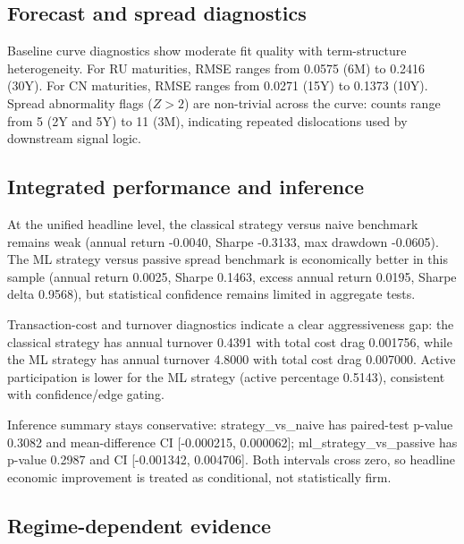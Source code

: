 \documentclass[a4paper,12pt]{extarticle}
\begin{document}
\subsection{Forecast and spread diagnostics}

Baseline curve diagnostics show moderate fit quality with term-structure heterogeneity. For RU maturities, RMSE ranges from 0.0575 (6M) to 0.2416 (30Y). For CN maturities, RMSE ranges from 0.0271 (15Y) to 0.1373 (10Y). Spread abnormality flags ($Z>2$) are non-trivial across the curve: counts range from 5 (2Y and 5Y) to 11 (3M), indicating repeated dislocations used by downstream signal logic.

\subsection{Integrated performance and inference}

At the unified headline level, the classical strategy versus naive benchmark remains weak (annual return -0.0040, Sharpe -0.3133, max drawdown -0.0605). The ML strategy versus passive spread benchmark is economically better in this sample (annual return 0.0025, Sharpe 0.1463, excess annual return 0.0195, Sharpe delta 0.9568), but statistical confidence remains limited in aggregate tests.

Transaction-cost and turnover diagnostics indicate a clear aggressiveness gap: the classical strategy has annual turnover 0.4391 with total cost drag 0.001756, while the ML strategy has annual turnover 4.8000 with total cost drag 0.007000. Active participation is lower for the ML strategy (active percentage 0.5143), consistent with confidence/edge gating.

Inference summary stays conservative: strategy\_vs\_naive has paired-test p-value 0.3082 and mean-difference CI [-0.000215, 0.000062]; ml\_strategy\_vs\_passive has p-value 0.2987 and CI [-0.001342, 0.004706]. Both intervals cross zero, so headline economic improvement is treated as conditional, not statistically firm.

\subsection{Regime-dependent evidence}
\end{document}
